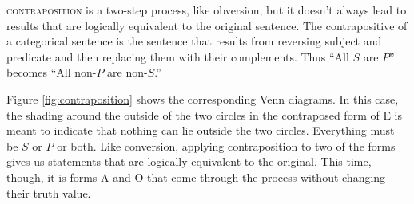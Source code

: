 \textsc{\gls{contraposition}} is a two-step process, like obversion, but it doesn't always lead to results that are logically equivalent to the original sentence. The contrapositive of a categorical sentence is the sentence that results from reversing subject and predicate and then replacing them with their complements. Thus ``All $S$ are $P$'' becomes ``All non-$P$ are non-$S$.'' 

Figure \ref{fig:contraposition} shows the corresponding Venn diagrams. In this case, the shading around the outside of the two circles in the contraposed form of E is meant to indicate that nothing can lie outside the two circles. Everything must be $S$ or $P$ or both. Like conversion, applying contraposition to two of the forms gives us statements that are logically equivalent to the original. This time, though, it is forms A and O that come through the process without changing their truth value. 

